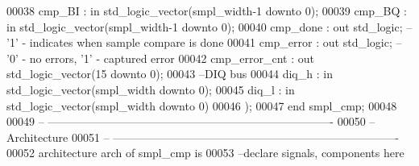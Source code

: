 \begin{DoxyCode}
00038       \textcolor{vhdlchar}{cmp_BI}         \textcolor{vhdlchar}{:} \textcolor{keywordflow}{in} \textcolor{comment}{std\_logic\_vector}\textcolor{vhdlchar}{(}\textcolor{vhdlchar}{smpl_width}\textcolor{vhdlchar}{-}\textcolor{vhdllogic}{}\textcolor{vhdllogic}{1} \textcolor{keywordflow}{downto} \textcolor{vhdllogic}{}\textcolor{vhdllogic}{0}\textcolor{vhdlchar}{)};
00039       \textcolor{vhdlchar}{cmp_BQ}         \textcolor{vhdlchar}{:} \textcolor{keywordflow}{in} \textcolor{comment}{std\_logic\_vector}\textcolor{vhdlchar}{(}\textcolor{vhdlchar}{smpl_width}\textcolor{vhdlchar}{-}\textcolor{vhdllogic}{}\textcolor{vhdllogic}{1} \textcolor{keywordflow}{downto} \textcolor{vhdllogic}{}\textcolor{vhdllogic}{0}\textcolor{vhdlchar}{)};
00040       \textcolor{vhdlchar}{cmp_done}       \textcolor{vhdlchar}{:} \textcolor{keywordflow}{out} \textcolor{comment}{std\_logic};\textcolor{keyword}{     -- '1' - indicates when sample compare is done}
00041       \textcolor{vhdlchar}{cmp_error}      \textcolor{vhdlchar}{:} \textcolor{keywordflow}{out} \textcolor{comment}{std\_logic};\textcolor{keyword}{     -- '0' - no errors, '1' - captured error}
00042       \textcolor{vhdlchar}{cmp_error_cnt}  \textcolor{vhdlchar}{:} \textcolor{keywordflow}{out} \textcolor{comment}{std\_logic\_vector}\textcolor{vhdlchar}{(}\textcolor{vhdllogic}{}\textcolor{vhdllogic}{15} \textcolor{keywordflow}{downto} \textcolor{vhdllogic}{}\textcolor{vhdllogic}{0}\textcolor{vhdlchar}{)};
00043 \textcolor{keyword}{      --DIQ bus}
00044       \textcolor{vhdlchar}{diq_h}          \textcolor{vhdlchar}{:} \textcolor{keywordflow}{in} \textcolor{comment}{std\_logic\_vector}\textcolor{vhdlchar}{(}\textcolor{vhdlchar}{smpl_width} \textcolor{keywordflow}{downto} \textcolor{vhdllogic}{}\textcolor{vhdllogic}{0}\textcolor{vhdlchar}{)};
00045       \textcolor{vhdlchar}{diq_l}          \textcolor{vhdlchar}{:} \textcolor{keywordflow}{in} \textcolor{comment}{std\_logic\_vector}\textcolor{vhdlchar}{(}\textcolor{vhdlchar}{smpl_width} \textcolor{keywordflow}{downto} \textcolor{vhdllogic}{}\textcolor{vhdllogic}{0}\textcolor{vhdlchar}{)}  
00046         \textcolor{vhdlchar}{)};
00047 \textcolor{keywordflow}{end} \textcolor{vhdlchar}{smpl\_cmp};
00048 
00049 \textcolor{keyword}{-- ----------------------------------------------------------------------------}
00050 \textcolor{keyword}{-- Architecture}
00051 \textcolor{keyword}{-- ----------------------------------------------------------------------------}
00052 \textcolor{keywordflow}{architecture} arch \textcolor{keywordflow}{of} smpl_cmp is
00053 \textcolor{keyword}{--declare signals,  components here}

\end{DoxyCode}

